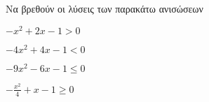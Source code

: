 Να βρεθούν οι λύσεις των παρακάτω ανισώσεων
\begin{multicols}{2}
\begin{alist}
\item $ -x^2+2x-1>0 $
\item $ -4x^2+4x-1<0 $
\item $ -9x^2-6x-1\leq 0 $
\item $ -\frac{x^2}{4}+x-1\geq 0 $
\end{alist}
\end{multicols}
